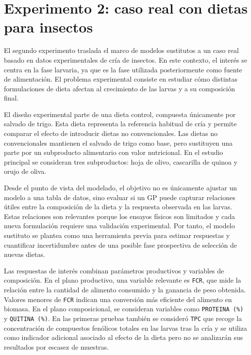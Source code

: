 \section{Experimento 2: caso real con dietas para insectos}
\label{subsec:experimento_caso_real}

El segundo experimento traslada el marco de modelos sustitutos a un caso real basado en datos experimentales de cría de insectos. En este contexto, el interés se centra en la fase larvaria, ya que es la fase utilizada posteriormente como fuente de alimentación. El problema experimental consiste en estudiar cómo distintas formulaciones de dieta afectan al crecimiento de las larvas y a su composición final.

El diseño experimental parte de una dieta control, compuesta únicamente por salvado de trigo. Esta dieta representa la referencia habitual de cría y permite comparar el efecto de introducir dietas no convencionales. Las dietas no convencionales mantienen el salvado de trigo como base, pero sustituyen una parte por un subproducto alimentario con valor nutricional. En el estudio principal se consideran tres subproductos: hoja de olivo, cascarilla de quinoa y orujo de oliva.

Desde el punto de vista del modelado, el objetivo no es únicamente ajustar un modelo a una tabla de datos, sino evaluar si un GP puede capturar relaciones útiles entre la composición de la dieta y la respuesta observada en las larvas. Estas relaciones son relevantes porque los ensayos físicos son limitados y cada nueva formulación requiere una validación experimental. Por tanto, el modelo sustituto se plantea como una herramienta previa para estimar respuestas y cuantificar incertidumbre antes de una posible fase prospectiva de selección de nuevas dietas.

Las respuestas de interés combinan parámetros productivos y variables de composición. En el plano productivo, una variable relevante es \texttt{FCR}, que mide la relación entre la cantidad de alimento consumido y la ganancia de peso obtenida. Valores menores de \texttt{FCR} indican una conversión más eficiente del alimento en biomasa. En el plano composicional, se consideran variables como \texttt{PROTEINA (\%)} y \texttt{QUITINA (\%)}. En las primeras pruebas también se consideró \texttt{TPC} que recoge la concentración de compuestos fenólicos totales en las larvas tras la cría y se utiliza como indicador adicional asociado al efecto de la dieta pero no se analizarán sus resultados por escasez de muestras.

